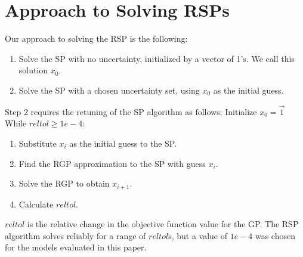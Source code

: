 \section{Approach to Solving RSPs}

Our approach to solving the RSP is the following: 

\begin{enumerate}
    \item Solve the SP with no uncertainty, initialized by a vector of 1's. We call this solution $x_0$.
    \item Solve the SP with a chosen uncertainty set, using $x_0$ as the initial guess. 
\end{enumerate}

Step 2 requires the retuning of the SP algorithm as follows:
\newline
\newline
Initialize $x_0 = \vec{1}$ \newline
 While $reltol \geq 1e-4$:
    \begin{enumerate}
        \item Substitute $x_i$ as the initial guess to the SP. 
        \item Find the RGP approximation to the SP with guess $x_i$.
        \item Solve the RGP to obtain $x_{i+1}$. 
        \item Calculate $reltol$.
    \end{enumerate}

$reltol$ is the relative change in the objective function value for the GP. The RSP algorithm solves reliably for a range of $reltol$s, but a value of $1e-4$ was chosen for the models evaluated in this paper. 